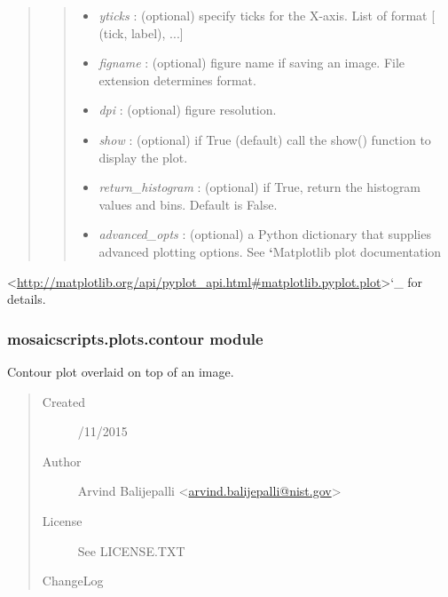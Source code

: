 \documentclass[letterpaper,10pt,english]{sphinxmanual}
\begin{document}
\begin{fulllineitems}
\begin{quote}
\begin{quote}
\begin{description}
\begin{itemize}
\item {} 
\emph{yticks} :                    (optional) specify ticks for the X-axis. List of format {[} (tick, label), ...{]}

\item {} 
\emph{figname} :                   (optional) figure name if saving an image. File extension determines format.

\item {} 
\emph{dpi} :                               (optional) figure resolution.

\item {} 
\emph{show} :                              (optional) if True (default) call the show() function to display the plot.

\item {} 
\emph{return\_histogram} :  (optional) if True, return the histogram values and bins. Default is False.

\item {} 
\emph{advanced\_opts} :             (optional) a Python dictionary that supplies advanced plotting options. See {\color{red}\bfseries{}{}`}Matplotlib plot documentation

\end{itemize}

\end{description}\end{quote}
\end{quote}

\textless{}\href{http://matplotlib.org/api/pyplot\_api.html\#matplotlib.pyplot.plot}{http://matplotlib.org/api/pyplot\_api.html\#matplotlib.pyplot.plot}\textgreater{}{}`\_ for details.

\end{fulllineitems}



\subsubsection{mosaicscripts.plots.contour module}
\label{api-doc/mosaicscripts:module-mosaicscripts.plots.contour}\label{api-doc/mosaicscripts:mosaicscripts-plots-contour-module}
Contour plot overlaid on top of an image.
\begin{quote}\begin{description}
\item[{Created}] /11/2015

\item[{Author}] \leavevmode
Arvind Balijepalli \textless{}\href{mailto:arvind.balijepalli@nist.gov}{arvind.balijepalli@nist.gov}\textgreater{}

\item[{License}] \leavevmode
See LICENSE.TXT

\item[{ChangeLog}] \leavevmode
\end{description}\end{quote}
\end{document}
